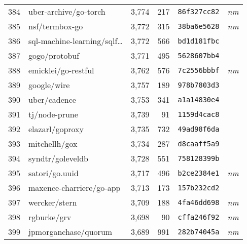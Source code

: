 {\begin{supertabular}{llrrll}
        384 &              uber-archive/go-torch &  3,774 &    217 &  \texttt{86f327cc82} &  \textit{nm} \\
        385 &                     nsf/termbox-go &  3,772 &    315 &  \texttt{38ba6e5628} &  \textit{nm} \\
        386 &    sql-machine-learning/sqlf\ldots &  3,772 &    566 &  \texttt{bd1d181fbc} &              \\
        387 &                      gogo/protobuf &  3,771 &    495 &  \texttt{5628607bb4} &              \\
        388 &                emicklei/go-restful &  3,762 &    576 &  \texttt{7c2556bbbf} &  \textit{nm} \\
        389 &                        google/wire &  3,757 &    189 &  \texttt{978b7803d3} &              \\
        390 &                       uber/cadence &  3,753 &    341 &  \texttt{a1a14830e4} &              \\
        391 &                      tj/node-prune &  3,739 &     91 &  \texttt{1159d4cac8} &              \\
        392 &                    elazarl/goproxy &  3,735 &    732 &  \texttt{49ad98f6da} &              \\
        393 &                      mitchellh/gox &  3,734 &    287 &  \texttt{d8caaff5a9} &              \\
        394 &                   syndtr/goleveldb &  3,728 &    551 &  \texttt{758128399b} &              \\
        395 &                     satori/go.uuid &  3,717 &    496 &  \texttt{b2ce2384e1} &  \textit{nm} \\
        396 &           maxence-charriere/go-app &  3,713 &    173 &  \texttt{157b232cd2} &              \\
        397 &                      wercker/stern &  3,709 &    188 &  \texttt{4fa46dd698} &  \textit{nm} \\
        398 &                        rgburke/grv &  3,698 &     90 &  \texttt{cffa246f92} &  \textit{nm} \\
        399 &               jpmorganchase/quorum &  3,689 &    991 &  \texttt{282b74045a} &  \textit{nm} \\

\end{supertabular}}
